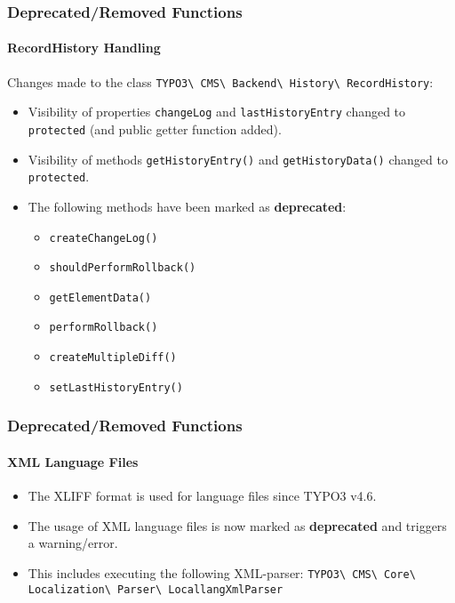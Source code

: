 
\begin{frame}[fragile]
	\frametitle{Deprecated/Removed Functions}
	\framesubtitle{RecordHistory Handling}

	Changes made to the class
		\smaller
			\texttt{TYPO3\textbackslash
				CMS\textbackslash
				Backend\textbackslash
				History\textbackslash
				RecordHistory}:
		\normalsize

	\begin{itemize}

		\item Visibility of properties \texttt{changeLog} and \texttt{lastHistoryEntry}
			changed to \texttt{protected} (and public getter function added).
		\item Visibility of methods \texttt{getHistoryEntry()} and \texttt{getHistoryData()}
			changed to \texttt{protected}.
		\item The following methods have been marked as \textbf{deprecated}:

			\begin{itemize}\smaller
				\item \texttt{createChangeLog()}
				\item \texttt{shouldPerformRollback()}
				\item \texttt{getElementData()}
				\item \texttt{performRollback()}
				\item \texttt{createMultipleDiff()}
				\item \texttt{setLastHistoryEntry()}
			\end{itemize}\normalsize

	\end{itemize}

\end{frame}


\begin{frame}[fragile]
	\frametitle{Deprecated/Removed Functions}
	\framesubtitle{XML Language Files}

	\begin{itemize}
		\item The XLIFF format is used for language files since TYPO3 v4.6.
		\item The usage of XML language files is now marked as \textbf{deprecated}
			and triggers a warning/error.
		\item This includes executing the following XML-parser:\newline
			\small
				\texttt{TYPO3\textbackslash
					CMS\textbackslash
					Core\textbackslash
					Localization\textbackslash
					Parser\textbackslash
					LocallangXmlParser}
			\normalsize
	\end{itemize}

\end{frame}


